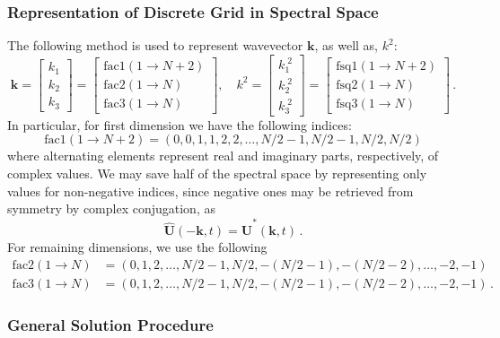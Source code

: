 \documentclass{pracamgren}
\begin{document}
\subsubsection{Representation of Discrete Grid in Spectral Space}

The following method is used to represent wavevector $\mathbf{k}$, as well as, $k^2$:
$$
\mathbf{k} =
\begin{bmatrix}
k_1 \\ k_2 \\ k_3
\end{bmatrix}
=
\begin{bmatrix}
\text{fac1}(1 \rightarrow N + 2) \\ \text{fac2}(1 \rightarrow N) \\ \text{fac3}(1 \rightarrow N)
\end{bmatrix} ,
\quad
k^2 =
\begin{bmatrix}
k_1^{\; 2} \\ k_2^{\; 2} \\ k_3^{\; 2}
\end{bmatrix}
=
\begin{bmatrix}
\text{fsq1}(1 \rightarrow N + 2) \\ \text{fsq2}(1 \rightarrow N) \\ \text{fsq3}(1 \rightarrow N)
\end{bmatrix}
\, .
$$
In particular, for first dimension we have the following indices:
$$ \text{fac1}(1 \rightarrow N + 2) = (0, 0, 1, 1, 2, 2, \ldots, N/2 - 1, N/2 - 1, N/2, N/2)  $$
where alternating elements represent real and imaginary parts, respectively, of complex values.
We may save half of the spectral space by representing only values for non-negative indices, since negative ones may be retrieved from symmetry by complex conjugation, as
$$ \mathbf{\hat{U}}(- \mathbf{k}, t) = \mathbf{\hat{U}}^* (\mathbf{k}, t) \, . $$
For remaining dimensions, we use the following
\begin{align*}
\text{fac2}(1 \rightarrow N) &= (0, 1, 2, \ldots, N/2 - 1, N/2, -(N/2 -1), -(N/2 -2), \ldots, -2, -1) \\
\text{fac3}(1 \rightarrow N) &= (0, 1, 2, \ldots, N/2 - 1, N/2, -(N/2 -1), -(N/2 -2), \ldots, -2, -1) \, .
\end{align*}

\subsubsection{General Solution Procedure}
\end{document}
